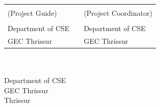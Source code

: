	
	\begin{singlespace}
		\vspace*{2cm}
		\begin{table}[h!]
			\centering
			\begin{tabular}{p{7cm} p{0.9cm} p{7cm}} 
				\textbf{\guide} && \textbf{\projcordinatorA} \\
				(Project Guide) &&  (Project Coordinator)\\
				\guidedes & & \projcordinatorAdes\\ 
				Department of CSE && Department of CSE\\ 
				GEC Thrissur & &GEC Thrissur\\
				
			\end{tabular}
			
		\end{table}
		
		\vspace*{1.3cm}
		
		\begin{center}
			
			\textbf{\hod} \\ 
			\hoddes\\ 
			Department of CSE\\ 
			GEC Thrissur\\
			Thrissur\\
			
		\end{center}
	\end{singlespace}
	
	\thispagestyle{empty}



